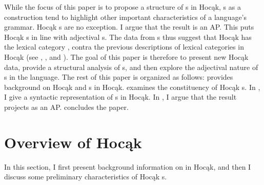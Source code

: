 \documentclass[output=paper]{LSP/langsci}
\begin{document}
\begin{exe}
\ex\label{ex:rosen:2}
{\hspace{1em}}\newline
{}
\end{exe}

While the focus of this paper is to propose a structure of s in Hocąk, s as a construction tend to highlight other important characteristics of a language's grammar. Hocąk s are no exception. I argue that the result  is an AP. This puts Hocąk s in line with  adjectival s. The data from s
thus suggest that Hocąk has the lexical category , contra the previous descriptions of lexical categories in Hocąk (see \citealt{Lipkind1945}, \citealt{Susman1943}, and \citealt{Helmbrecht2006b}). The goal of this paper is therefore to present new Hocąk data, provide a structural analysis of s, and then explore the adjectival nature of  s in the language. The rest of this paper is organized as follows:  provides background on Hocąk  and s in Hocąk.  examines the constituency of Hocąk s. In , I give a syntactic representation of s in Hocąk. In , I argue that the result  projects as an AP.  concludes the paper.

\section{Overview of Hocąk }\label{sec:rosen:2}

In this section, I first present background information on  in Hocąk, and then I discuss some preliminary characteristics of Hocąk s.
\end{document}
